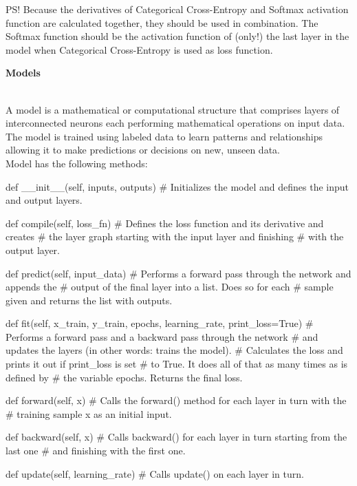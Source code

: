 \documentclass{article}
\begin{document}
    PS! Because the derivatives of Categorical Cross-Entropy and Softmax activation
    function are calculated together, they should be used in combination. The Softmax 
    function should be the activation function of (only!) the last layer in the model when 
    Categorical Cross-Entropy is used as loss function.
    \clearpage

    \hypertarget{models}{\textbf{Models}} \\

    A model is a mathematical or computational structure that comprises 
    layers of interconnected neurons each performing mathematical operations 
    on input data. The model is trained using labeled data to learn 
    patterns and relationships allowing it to make predictions or decisions 
    on new, unseen data. \\

    Model has the following methods:
\begin{python}
def __init__(self,
             inputs,
             outputs)
# Initializes the model and defines the input and output layers.
\end{python}
\begin{python}
def compile(self,
            loss_fn)
# Defines the loss function and its derivative and creates
# the layer graph starting with the input layer and finishing
# with the output layer.
\end{python}
\begin{python}
def predict(self,
            input_data)
# Performs a forward pass through the network and appends the
# output of the final layer into a list. Does so for each
# sample given and returns the list with outputs.
\end{python}
\begin{python}
def fit(self,
        x_train,
        y_train,
        epochs,
        learning_rate,
        print_loss=True)
# Performs a forward pass and a backward pass through the network
# and updates the layers (in other words: trains the model).
# Calculates the loss and prints it out if print_loss is set 
# to True. It does all of that as many times as is defined by 
# the variable epochs. Returns the final loss.
\end{python}
\begin{python}
def forward(self,
            x)
# Calls the forward() method for each layer in turn with the 
# training sample x as an initial input.
\end{python}
\begin{python}
def backward(self,
             x)
# Calls backward() for each layer in turn starting from the last one
# and finishing with the first one.
\end{python}
\begin{python}
def update(self,
           learning_rate)
# Calls update() on each layer in turn.
\end{python}
\end{document}
